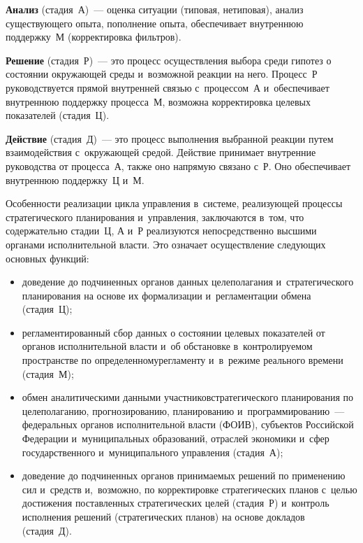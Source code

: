 \begin{multicols}{2}
    \textbf{Анализ} (стадия~А)~--- оценка ситуации (типовая, нетиповая), 
анализ существующего опыта, пополнение опыта, обеспечивает внутреннюю 
поддержку~М (корректировка фильтров).
    
    \textbf{Решение} (стадия~Р)~--- это процесс осуществления выбора 
среди гипотез о состоянии окружающей среды и~возможной реакции на него. 
Процесс~Р руководствуется прямой внутренней связью с~процессом~А 
и~обеспечивает внутреннюю поддержку процесса~М, возможна 
корректировка целевых показателей (стадия~Ц).
    
    \textbf{Действие} (стадия~Д)~--- это процесс выполнения выбранной 
реакции путем взаимодействия с~окружающей средой. Действие принимает 
внутренние руководства от процесса~А, также оно напрямую связано с~Р. 
Оно обеспечивает внутреннюю поддержку~Ц и~М.
    
    Особенности реализации цикла управления в~сис\-те\-ме, реализующей 
процессы стратегического планирования и~управления, заключаются в~том, 
что содержательно стадии~Ц, А и~Р реализуются непосредственно высшими 
органами исполнительной власти. Это означает осуществление сле\-ду\-ющих 
основных функций:
    \begin{itemize}
\item  доведение до подчиненных органов данных целеполагания 
и~стратегического планирования на основе их формализации 
и~регламентации обмена (стадия~Ц);
\item регламентированный сбор данных о состоянии целевых показателей от 
органов испол\-нительной власти и~об обстановке в~конт\-ро\-ли\-ру\-емом 
пространстве по определенному\linebreak регламенту и~в~режиме реального времени 
(стадия~М);
\item обмен аналитическими данными участников\linebreak стратегического 
планирования по целеполаганию, прогнозированию, планированию 
и~программированию~--- федеральных органов исполнительной власти 
(ФОИВ), субъектов Россий\-ской Федерации и~муниципальных образований, 
отраслей экономики и~сфер государственного и~муниципального управления 
(стадия~А);
\item  доведение до подчиненных органов принимаемых решений по 
применению сил и~средств и,~возможно, по корректировке стратегических 
планов с~целью достижения поставленных стратегических целей (стадия~Р) 
и~контроль исполнения решений (стратегических планов) на основе 
докладов (стадия~Д).
    \end{itemize}
    

\end{multicols}
